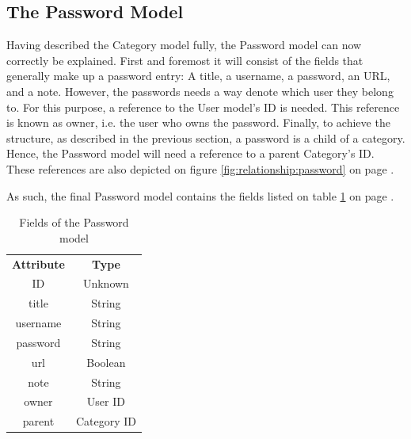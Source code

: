 
		\subsection{The Password Model}
			\label{sec:model:password}
			Having described the Category model fully, the Password model can now correctly be explained. First and foremost it will consist of the fields that generally make up a password entry: A title, a username, a password, an URL, and a note. However, the passwords needs a way denote which user they belong to. For this purpose, a reference to the User model's ID is needed. This reference is known as owner, i.e. the user who owns the password. Finally, to achieve the structure, as described in the previous section, a password is a child of a category. Hence, the Password model will need a reference to a parent Category's ID. These references are also depicted on figure \ref{fig:relationship:password} on page \pageref{fig:relationship:password}.

			As such, the final Password model contains the fields listed on table \ref{fig:model:password} on page \pageref{fig:model:password}.

			\begin{table}[p]
				\centering
				\begin{tabular}{c|c}
					\textbf{Attribute} 		& \textbf{Type} 	\\
					ID 						& Unknown 			\\
					title 					& String 			\\
					username 				& String 			\\
					password 				& String 			\\
					url						& Boolean 			\\
					note  					& String 			\\
					owner 					& User ID 			\\
					parent 					& Category ID 		\\
				\end{tabular}
				\caption{Fields of the Password model}
				\label{fig:model:password}
			\end{table}
			
